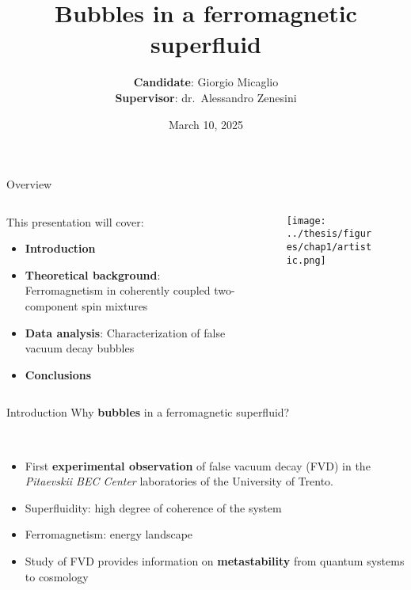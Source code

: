 \documentclass[aspectratio=169]{beamer}
\title[Bubbles in a ferromagnetic superfluid] %
{Bubbles in a ferromagnetic superfluid} %
\author{\textbf{Candidate}: Giorgio Micaglio\\\textbf{Supervisor}: dr.\ Alessandro Zenesini}
\institute{Bachelor's Degree in Physics}
\date[March 10, 2025]  %
{March 10, 2025} %
\begin{document}
\begin{frame}[plain]
  \titlepage
\end{frame}

\begin{frame}{Overview}
  \begin{columns}
      \begin{column}{0.7\textwidth}
          This presentation will cover:
          \begin{itemize}
              \item \textbf{Introduction}
              \item \textbf{Theoretical background}: Ferromagnetism in coherently coupled two-component spin mixtures
              \item \textbf{Data analysis}: Characterization of false vacuum decay bubbles
              \item \textbf{Conclusions}
          \end{itemize}
      \end{column}
      \begin{column}{0.3\textwidth}
          \begin{figure}
              \centering
              \texttt{[image: ../thesis/figures/chap1/artistic.png]}
          \end{figure}
      \end{column}
  \end{columns}
\end{frame}

\begin{frame}{Introduction}
  Why \textbf{bubbles} in a ferromagnetic superfluid?

  ~

  \begin{itemize}
      \item First \textbf{experimental observation} of false vacuum decay (FVD) in the \emph{Pitaevskii BEC Center} laboratories of the University of Trento.
      \item Superfluidity: high degree of coherence of the system
      \item Ferromagnetism: energy landscape
      \item Study of FVD provides information on \textbf{metastability} from quantum systems to cosmology
  \end{itemize}
  
\end{frame}
\end{document}
